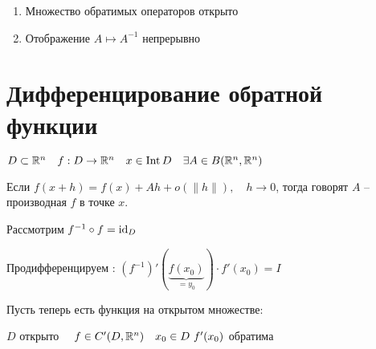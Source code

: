     \begin{remark}\leavevmode
        \begin{enumerate}
            \item Множество обратимых операторов открыто
            \item Отображение $A \mapsto A^{-1}$ непрерывно
        \end{enumerate}
    \end{remark}
    
    \section*{Дифференцирование обратной функции}

    $D \subset \mathbb{R}^n \quad f : D \rightarrow \mathbb{R}^n \quad x \in \operatorname{Int} D \quad \exists A \in B(\mathbb{R}^n, \mathbb{R}^n)$
    
    \begin{definition}
        Если $f(x + h) = f(x) + Ah + o(\|h\|), \quad h \rightarrow 0$, тогда говорят $A$ -- производная $f$ в точке $x$.
    \end{definition}

    \begin{figure}[ht]
        \centering
        \label{fig:figurka}
    \end{figure}


    Рассмотрим $f^{-1} \circ f = \operatorname*{id}_D$

    Продифференцируем : $(f^{-1})'(\underbrace{f(x_0)}_{= y_0}) \cdot f'(x_0) = I$

    Пусть теперь есть функция на открытом множестве:

    $D$ открыто $\quad f \in C'(D, \mathbb{R}^n) \quad x _0 \in D \ f'(x_0)$ обратима

